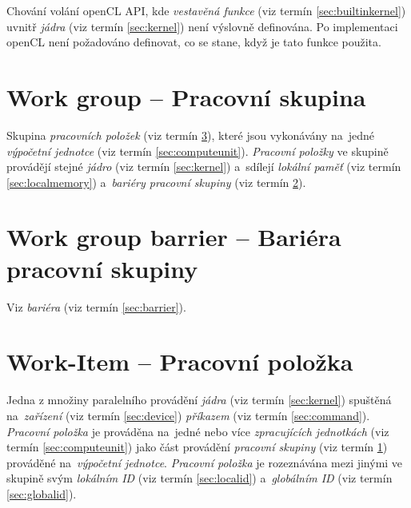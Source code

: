 Chování volání openCL API, kde \emph{vestavěná funkce} (viz termín \ref{sec:builtinkernel}) uvnitř \emph{jádra} (viz termín \ref{sec:kernel}) není výslovně definována. Po implementaci openCL není požadováno definovat, co se stane, když je tato funkce použita.

\section{Work group -- Pracovní skupina}
\label{sec:workgroup}

Skupina \emph{pracovních položek} (viz termín \ref{sec:workitem}), které jsou vykonávány na~jedné \emph{výpočetní jednotce} (viz termín \ref{sec:computeunit}). \emph{Pracovní položky} ve skupině provádějí stejné \emph{jádro} (viz termín \ref{sec:kernel}) a~sdílejí \emph{lokální paměť} (viz termín \ref{sec:localmemory}) a~\emph{bariéry pracovní skupiny} (viz termín \ref{sec:workgroupbarrier}).

\section{Work group barrier -- Bariéra pracovní skupiny}
\label{sec:workgroupbarrier}

Viz \emph{bariéra} (viz termín \ref{sec:barrier}).

\section{Work-Item -- Pracovní položka}
\label{sec:workitem}

Jedna z množiny paralelního provádění \emph{jádra} (viz termín \ref{sec:kernel}) spuštěná na~\emph{zařízení} (viz termín \ref{sec:device}) \emph{příkazem} (viz termín \ref{sec:command}). \emph{Pracovní položka} je prováděna na~jedné nebo více \emph{zpracujících jednotkách} (viz termín \ref{sec:computeunit}) jako část provádění \emph{pracovní skupiny} (viz termín \ref{sec:workgroup}) prováděné na~\emph{výpočetní jednotce}. \emph{Pracovní položka} je rozeznávána mezi jinými ve skupině svým \emph{lokálním ID} (viz termín \ref{sec:localid}) a~\emph{globálním ID} (viz termín \ref{sec:globalid}).


